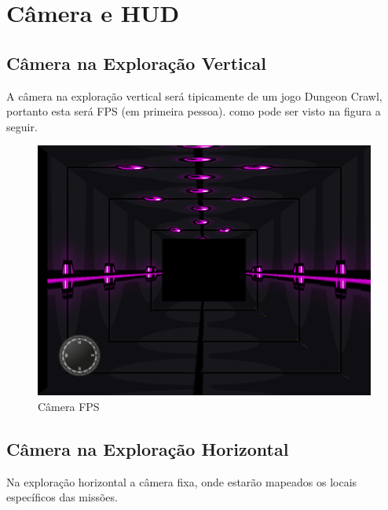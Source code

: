 \documentclass[11pt]{article} %
\begin{document}
\newpage

\section{Câmera e HUD}

\subsection{Câmera na Exploração Vertical}

A câmera na exploração vertical será tipicamente de um jogo Dungeon Crawl, portanto esta será FPS (em primeira pessoa). como pode ser visto na figura a seguir.

\begin{figure}[!htp]
\centering
\includegraphics[scale=0.25]{res/dungeon.png}
\caption{Câmera FPS}
\label{Câmera FPS}
\end{figure}

\newpage

\subsection{Câmera na Exploração Horizontal}

Na exploração horizontal a câmera fixa, onde estarão mapeados os locais específicos das missões.
\end{document}
